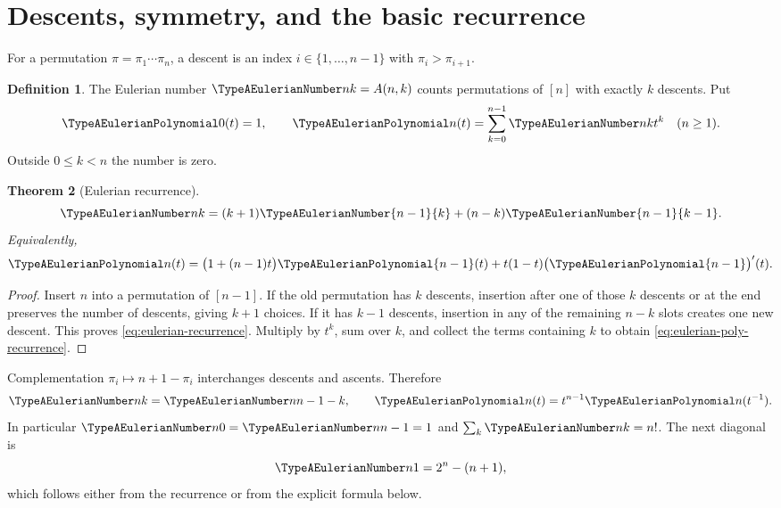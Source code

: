 \documentclass[11pt,a4paper,oneside,openany]{book}
\newtheorem{theorem}{Theorem}[chapter]
\theoremstyle{definition}
\newtheorem{definition}[theorem]{Definition}
\theoremstyle{remark}
\begin{document}
\section{Descents, symmetry, and the basic recurrence}
For a permutation $\pi=\pi_1\cdots\pi_n$, a descent is an index
$i\in\{1,\ldots,n-1\}$ with $\pi_i>\pi_{i+1}$.
\begin{definition}
The Eulerian number $\TypeAEulerianNumber nk=A(n,k)$ counts permutations of $[n]$ with
exactly $k$ descents.  Put
\[
 \TypeAEulerianPolynomial0(t)=1,
 \qquad
 \TypeAEulerianPolynomial n(t)=\sum_{k=0}^{n-1}\TypeAEulerianNumber nk t^k\quad(n\ge1).
\]
Outside $0\le k<n$ the number is zero.
\end{definition}

\begin{theorem}[Eulerian recurrence]\label{thm:eulerian-recurrence}
\begin{equation}\label{eq:eulerian-recurrence}
 \TypeAEulerianNumber nk=(k+1)\TypeAEulerianNumber{n-1}{k}
 +(n-k)\TypeAEulerianNumber{n-1}{k-1}.
\end{equation}
Equivalently,
\begin{equation}\label{eq:eulerian-poly-recurrence}
 \TypeAEulerianPolynomial n(t)=\bigl(1+(n-1)t\bigr)\TypeAEulerianPolynomial{n-1}(t)
       +t(1-t)\bigl(\TypeAEulerianPolynomial{n-1}\bigr)'(t).
\end{equation}
\end{theorem}
\begin{proof}
Insert $n$ into a permutation of $[n-1]$.  If the old permutation has $k$
descents, insertion after one of those $k$ descents or at the end preserves the
number of descents, giving $k+1$ choices.  If it has $k-1$ descents, insertion in
any of the remaining $n-k$ slots creates one new descent.  This proves
\eqref{eq:eulerian-recurrence}.  Multiply by $t^k$, sum over $k$, and collect the
terms containing $k$ to obtain \eqref{eq:eulerian-poly-recurrence}.
\end{proof}

Complementation $\pi_i\mapsto n+1-\pi_i$ interchanges descents and ascents.
Therefore
\begin{equation}\label{eq:eulerian-symmetry}
 \TypeAEulerianNumber nk=\TypeAEulerianNumber n{n-1-k},
 \qquad
 \TypeAEulerianPolynomial n(t)=t^{n-1}\TypeAEulerianPolynomial n(t^{-1}).
\end{equation}
In particular $\TypeAEulerianNumber n0=\TypeAEulerianNumber n{n-1}=1$ and
$\sum_k\TypeAEulerianNumber nk=n!$.  The next diagonal is
\begin{equation}\label{eq:eulerian-k1}
 \TypeAEulerianNumber n1=2^n-(n+1),
\end{equation}
which follows either from the recurrence or from the explicit formula below.
\end{document}
